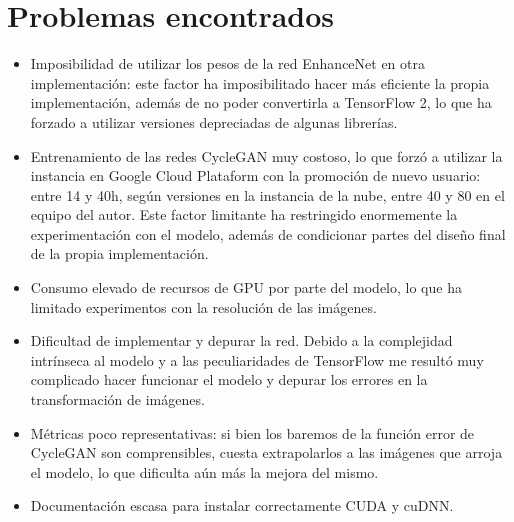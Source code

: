 \documentclass[[../main.tex]{subfiles}
\begin{document}
\section{Problemas encontrados}
\begin{itemize}
    \item Imposibilidad de utilizar los pesos de la red EnhanceNet en otra implementación: este factor ha imposibilitado hacer más eficiente la propia implementación, además de no poder convertirla a TensorFlow 2, lo que ha forzado a utilizar versiones depreciadas de algunas librerías. 
    \item Entrenamiento de las redes CycleGAN muy costoso, lo que forzó a utilizar la instancia en Google Cloud Plataform con la promoción de nuevo usuario: entre 14 y 40h, según versiones en la instancia de la nube, entre 40 y 80 en el equipo del autor. Este factor limitante ha restringido enormemente la experimentación con el modelo, además de condicionar partes del diseño final de la propia implementación.
    \item Consumo elevado de recursos de GPU por parte del modelo, lo que ha limitado experimentos con la resolución de las imágenes.
    \item Dificultad de implementar y depurar la red. Debido a la complejidad intrínseca al modelo y a las peculiaridades de TensorFlow me resultó muy complicado hacer funcionar el modelo y depurar los errores en la transformación de imágenes.
    \item Métricas poco representativas: si bien los baremos de la función error de CycleGAN son comprensibles, cuesta extrapolarlos a las imágenes que arroja el modelo, lo que dificulta aún más la mejora del mismo.
    \item Documentación escasa para instalar correctamente CUDA y cuDNN.
\end{itemize}
\end{document}
